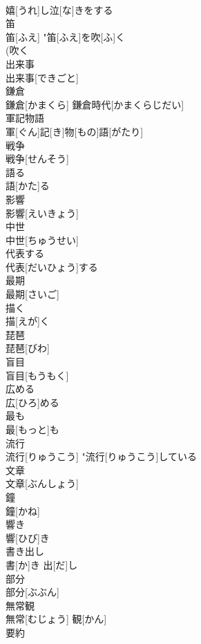 \documentclass[8pt]{extreport}
\begin{document}
\begin{CJK}{UTF8}{min}
\\	嬉[うれ]し泣[な]きをする 
\\	笛	
\\	笛[ふえ]	"笛[ふえ]を吹[ふ]く 
\\	(吹く 
\\	出来事	
\\	出来事[できごと]	
\\	鎌倉	
\\	鎌倉[かまくら]	鎌倉時代[かまくらじだい] 
\\	軍記物語	
\\	軍[ぐん]記[き]物[もの]語[がたり]	
\\	戦争	
\\	戦争[せんそう]	
\\	語る	
\\	語[かた]る	
\\	影響	
\\	影響[えいきょう]	
\\	中世	
\\	中世[ちゅうせい]	
\\	代表する	
\\	代表[だいひょう]する	
\\	最期	
\\	最期[さいご]	
\\	描く	
\\	描[えが]く	
\\	琵琶	
\\	琵琶[びわ]	
\\	盲目	
\\	盲目[もうもく]	
\\	広める	
\\	広[ひろ]める	
\\	最も	
\\	最[もっと]も	
\\	流行	
\\	流行[りゅうこう]	"流行[りゅうこう]している 
\\	文章	
\\	文章[ぶんしょう]	
\\	鐘	
\\	鐘[かね]	
\\	響き	
\\	響[ひび]き	
\\	書き出し	
\\	書[か]き 出[だ]し	
\\	部分	
\\	部分[ぶぶん]	
\\	無常観	
\\	無常[むじょう] 観[かん]	
\\	要約	

\end{CJK}
\end{document}
